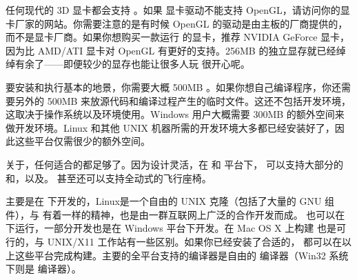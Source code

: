 任何现代的 3D 显卡都会支持 。如果  显卡驱动不能支持 OpenGL，请访问你的显卡厂家的网站。你需要注意的是有时候 OpenGL 的驱动是由主板的厂商提供的，而不是显卡厂商。如果你想购买一款运行 \FlightGear{} 的显卡，推荐 NVIDIA GeForce 显卡，因为比 AMD/ATI 显卡对 OpenGL 有更好的支持。256MB 的独立显存就已经绰绰有余了——即便较少的显存也能让很多人玩 \FlightGear{} 很开心呢。

要安装和执行基本的地景，你需要大概 500MB 。如果你想自己编译程序，你还需要另外的 500MB 来放源代码和编译过程产生的临时文件。这还不包括开发环境，这取决于操作系统以及环境使用。Windows 用户大概需要 300MB 的额外空间来做开发环境。Linux 和其他 UNIX 机器所需的开发环境大多都已经安装好了，因此这些平台仅需很少的额外空间。

关于，任何适合的都足够了。因为设计灵活，在  和  平台下，\FlightGear{} 可以支持大部分的和，以及。\FlightGear{} 甚至还可以支持全动式的飞行座椅。

\FlightGear{} 主要是在  下开发的，Linux是一个自由的 UNIX 克隆（包括了大量的 GNU 组件），与\FlightGear{} 有着一样的精神，也是由一群互联网上广泛的合作开发而成。\FlightGear{} 也可以在  下运行，一部分开发也是在 Windows 平台下开发。在 Mac OS X 上构建 \FlightGear{} 也是可行的，与 UNIX/X11 工作站有一些区别。如果你已经安装了合适的，\FlightGear{} 都可以在以上这些平台完成构建。主要的全平台支持的编译器是自由的  编译器（Win32 系统下则是   编译器）。

